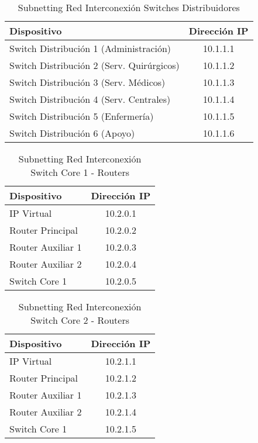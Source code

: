 \begin{table}[H]
    \centering
    \scriptsize
    \begin{tabular}{|l|c|}
        \hline
        \textbf{Dispositivo} & \textbf{Dirección IP} \\
        \hline
        Switch Distribución 1 (Administración) & 10.1.1.1 \\
        \hline
        Switch Distribución 2 (Serv. Quirúrgicos) & 10.1.1.2 \\
        \hline
        Switch Distribución 3 (Serv. Médicos) & 10.1.1.3 \\
        \hline
        Switch Distribución 4 (Serv. Centrales) & 10.1.1.4 \\
        \hline
        Switch Distribución 5 (Enfermería) & 10.1.1.5 \\
        \hline
        Switch Distribución 6 (Apoyo) & 10.1.1.6 \\
        \hline
    \end{tabular}
    \caption{Subnetting Red Interconexión Switches Distribuidores}
    \label{tab:InterconexionDistrSE}
\end{table}

\begin{table}[H]
    \centering
    \scriptsize
    \begin{tabular}{|l|c|}
        \hline
        \textbf{Dispositivo} & \textbf{Dirección IP} \\
        \hline
        IP Virtual & 10.2.0.1 \\
        \hline
        Router Principal & 10.2.0.2 \\
        \hline
        Router Auxiliar 1 & 10.2.0.3 \\
        \hline
        Router Auxiliar 2 & 10.2.0.4 \\
        \hline
        Switch Core 1 & 10.2.0.5 \\
        \hline
    \end{tabular}
    \caption{Subnetting Red Interconexión Switch Core 1 - Routers}
    \label{tab:InterconexionCore1-RouterSE}
\end{table}

\begin{table}[H]
    \centering
    \scriptsize
    \begin{tabular}{|l|c|}
        \hline
        \textbf{Dispositivo} & \textbf{Dirección IP} \\
        \hline
        IP Virtual & 10.2.1.1 \\
        \hline
        Router Principal & 10.2.1.2 \\
        \hline
        Router Auxiliar 1 & 10.2.1.3 \\
        \hline
        Router Auxiliar 2 & 10.2.1.4 \\
        \hline
        Switch Core 1 & 10.2.1.5 \\
        \hline
    \end{tabular}
    \caption{Subnetting Red Interconexión Switch Core 2 - Routers}
    \label{tab:InterconexionCore2-RouterSE}
\end{table}

